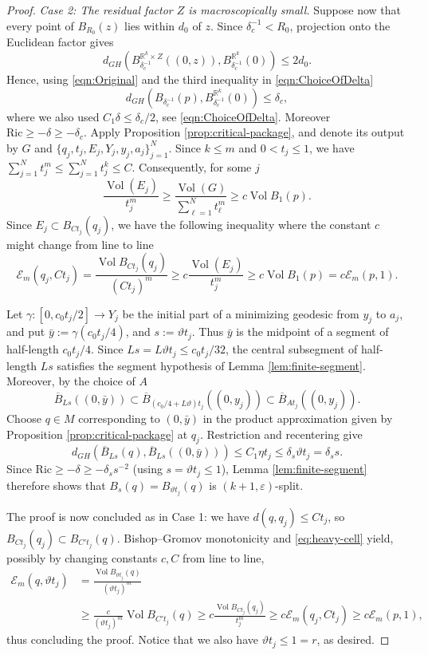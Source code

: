 \documentclass[10pt,a4paper]{amsart}
\newcommand{\Ex}{\mathcal E}
\DeclareMathOperator{\Vol}{Vol}
\begin{document}
\begin{proof}
\smallskip
\noindent
\emph{Case 2: The residual factor $Z$ is macroscopically small.}
Suppose now that every point of $B_{R_0}(z)$ lies within $d_0$ of
$z$. Since $\delta_c^{-1}<R_0$, projection onto the Euclidean factor
gives
\[
 d_{GH}\!\left(
 B_{\delta_c^{-1}}^{\mathbb R^k\times Z}((0,z)),
 B_{\delta_c^{-1}}^{\mathbb R^k}(0)\right)\leq2d_0.
\]
Hence, using \eqref{eqn:Original} and the third inequality in \eqref{eqn:ChoiceOfDelta}
\[
 d_{GH}\!\left(
 B_{\delta_c^{-1}}(p),
 B_{\delta_c^{-1}}^{\mathbb R^k}(0)\right)\leq\delta_c,
\]
where we also used $C_1\delta\leq \delta_c/2$, see \eqref{eqn:ChoiceOfDelta}. Moreover $\mathrm{Ric}\geq - \delta\geq -\delta_c$. 
Apply Proposition \ref{prop:critical-package}, and denote its output
by $G$ and $\{q_j,t_j,E_j,Y_j,y_j,a_j\}_{j=1}^N$.
Since $k\leq m$ and $0<t_j\leq1$, we have $
                    \sum_{j=1}^N t_j^m
                    \leq\sum_{j=1}^N t_j^k\leq C$. 
Consequently, for some $j$
\[
 \frac{\Vol(E_j)}{t_j^m}
 \geq\frac{\Vol(G)}{\sum_{\ell=1}^N t_\ell^m}
 \geq c\Vol B_1(p).
\]
Since $E_j\subset B_{Ct_j}(q_j)$, we have the following inequality where the constant $c$ might change from line to line
\begin{equation}\label{eq:heavy-cell}
 \Ex_m(q_j,Ct_j)
 =\frac{\Vol B_{Ct_j}(q_j)}{(Ct_j)^m}
 \geq c\frac{\Vol(E_j)}{t_j^m}
 \geq c\Vol B_1(p)=c\Ex_m(p,1).
\end{equation}

Let $\gamma:[0,c_0t_j/2]\to Y_j$ be the initial part of a minimizing
geodesic from $y_j$ to $a_j$, and put $
                       \bar y:=\gamma(c_0t_j/4)$, and $s:=\vartheta t_j$.
Thus $\bar y$ is the midpoint of a segment of half-length $c_0t_j/4$.
Since $Ls=L\vartheta t_j\leq c_0t_j/32$, the central subsegment of
half-length $Ls$ satisfies the segment hypothesis of
Lemma \ref{lem:finite-segment}.  Moreover, by the choice of $A$
\[
 \overline B_{Ls}((0,\bar y))
 \subset
 \overline B_{(c_0/4+L\vartheta)t_j}((0,y_j))
 \subset \overline{B}_{At_j}((0,y_j)).
\]
Choose $q\in M$ corresponding to $(0,\bar y)$ in the product
approximation given by Proposition \ref{prop:critical-package} at $q_j$.  Restriction and recentering give
\[
 d_{GH}\!\left(
 \overline B_{Ls}(q),
 \overline B_{Ls}((0,\bar y))
 \right)
 \leq C_1\eta t_j
 \leq\delta_s\vartheta t_j=\delta_ss.
\]
Since $\mathrm{Ric}\geq - \delta\geq -\delta_ss^{-2}$ (using $s=\vartheta t_j\leq 1$), Lemma \ref{lem:finite-segment} therefore shows that
$B_s(q)=B_{\vartheta t_j}(q)$ is $(k+1,\varepsilon)$-split.

The proof is now concluded as in Case 1: we have $d(q,q_j)\leq Ct_j$, so
$B_{Ct_j}(q_j)\subset B_{C't_j}(q)$. Bishop--Gromov monotonicity and
\eqref{eq:heavy-cell} yield, possibly by changing constants $c,C$ from line to line,
\[
 \begin{split}
 \Ex_m(q,\vartheta t_j)
 &=
   \frac{\Vol B_{\vartheta t_j}(q)}{(\vartheta t_j)^m}\\
 &\geq
   \frac{c}{(\vartheta t_j)^m}
   \Vol B_{C't_j}(q)\geq c\frac{\Vol B_{Ct_j}(q_j)}{t_j^m}
 \geq c\Ex_m(q_j,Ct_j)
 \geq c\Ex_m(p,1),
 \end{split}
\]
thus concluding the proof. Notice that we also have $\vartheta t_j\leq 1=r$, as desired.
\end{proof}
\end{document}
